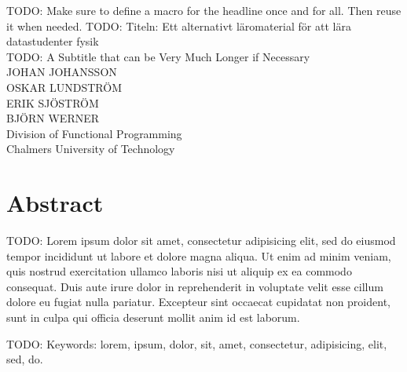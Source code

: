 TODO: Make sure to define a macro for the headline once and for all. Then reuse it when needed.
TODO: Titeln: Ett alternativt läromaterial för att lära datastudenter fysik\\
TODO: A Subtitle that can be Very Much Longer if Necessary\\
JOHAN JOHANSSON \\
OSKAR LUNDSTRÖM \\
ERIK SJÖSTRÖM \\
BJÖRN WERNER \\
Division of Functional Programming\\
Chalmers University of Technology \setlength{\parskip}{0.5cm}

\thispagestyle{plain}			%
\section*{Abstract}
TODO: Lorem ipsum dolor sit amet, consectetur adipisicing elit, sed do eiusmod tempor incididunt ut labore et dolore magna aliqua. Ut enim ad minim veniam, quis nostrud exercitation ullamco laboris nisi ut aliquip ex ea commodo consequat. Duis aute irure dolor in reprehenderit in voluptate velit esse cillum dolore eu fugiat nulla pariatur. Excepteur sint occaecat cupidatat non proident, sunt in culpa qui officia deserunt mollit anim id est laborum.

\vfill
TODO: Keywords: lorem, ipsum, dolor, sit, amet, consectetur, adipisicing, elit, sed, do.

\newpage				%
\thispagestyle{empty}
\mbox{}
